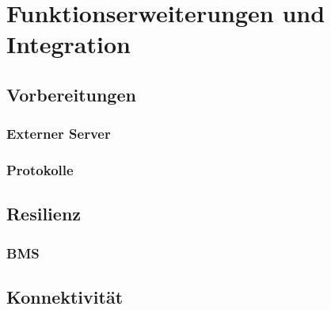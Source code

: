 \section{Funktionserweiterungen und Integration}
\label{sec:funktionserweiterungen-und-integration}

\subsection{Vorbereitungen}
\label{subsec:vorbereitungen}

\subsubsection{Externer Server}

\subsubsection{Protokolle}


\subsection{Resilienz}
\label{subsec:resilienz}

\subsubsection{BMS}

\subsection{Konnektivität}
\label{subsec:konnektivitat}

